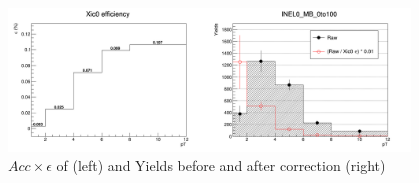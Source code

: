 \paragraph{}\mbox{}\\[1pt]
 \\

\begin{figure}[h]
    \centering
    \includegraphics[width=0.95\textwidth]{plots/s2_Xic0Eff_INEL0_MB_0to100.png}
    \caption{$Acc \times \epsilon$ of \Xic (left) and Yields before and after correction (right)}
    \label{fig:s2_Xic0Eff}
\end{figure}

\clearpage

\paragraph{}\mbox{}\\[1pt]

\clearpage

